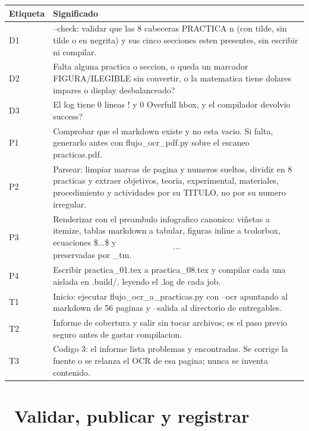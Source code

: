 \documentclass[11pt,a4paper]{article}
\newcommand{\iconotexto}[2]{\textcolor{cyanNeon}{\faIcon{#1}}~#2}
\begin{document}
\vspace{6pt}
\begin{tcolorbox}[cajaContenido, title={\faIcon{table}~Leyenda de etiquetas}]
\small
\begin{tabularx}{\linewidth}{@{}>{\centering\arraybackslash}p{1.4cm}X@{}}
\toprule
\textbf{Etiqueta} & \textbf{Significado} \\ \midrule
D1 & --check: validar que las 8 cabeceras PRACTICA n (con tilde, sin tilde o en negrita) y sus cinco secciones esten presentes, sin escribir ni compilar. \\
D2 & Falta alguna practica o seccion, o queda un marcador FIGURA/ILEGIBLE sin convertir, o la matematica tiene dolares impares o display desbalanceado? \\
D3 & El log tiene 0 lineas ! y 0 Overfull hbox, y el compilador devolvio success? \\
P1 & Comprobar que el markdown existe y no esta vacio. Si falta, generarlo antes con flujo\_ocr\_pdf.py sobre el escaneo practicas.pdf. \\
P2 & Parsear: limpiar marcas de pagina y numeros sueltos, dividir en 8 practicas y extraer objetivos, teoria, experimental, materiales, procedimiento y actividades por su TITULO, no por su numero irregular. \\
P3 & Renderizar con el preambulo infografico canonico: viñetas a itemize, tablas markdown a tabular, figuras inline a tcolorbox, ecuaciones \$...\$ y \[ ... \] preservadas por \_tm. \\
P4 & Escribir practica\_01.tex a practica\_08.tex y compilar cada una aislada en .build/, leyendo el .log de cada job. \\
T1 & Inicio: ejecutar flujo\_ocr\_a\_practicas.py con --ocr apuntando al markdown de 56 paginas y --salida al directorio de entregables. \\
T2 &  Informe de cobertura y salir sin tocar archivos; es el paso previo seguro antes de gastar compilacion. \\
T3 &  Codigo 3: el informe lista problemas y encontradas. Se corrige la fuente o se relanza el OCR de esa pagina; nunca se inventa contenido. \\
\bottomrule
\end{tabularx}
\end{tcolorbox}

\section{\iconotexto{check-circle}{Validar, publicar y registrar}}
\end{document}
